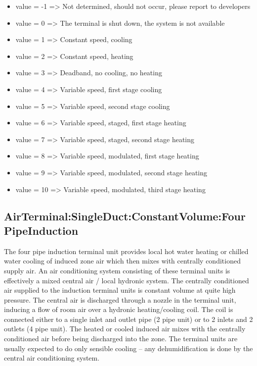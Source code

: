 \begin{itemize}
\item
  value = -1  => Not determined, should not occur, please report to developers
\item
  value = 0 => The terminal is shut down, the system is not available
\item
  value = 1 => Constant speed, cooling
\item
  value = 2 => Constant speed, heating
\item
  value = 3 => Deadband, no cooling, no heating
\item
  value = 4 => Variable speed, first stage cooling
\item
  value = 5 => Variable speed, second stage cooling
\item
  value = 6 => Variable speed, staged, first stage heating
\item
  value = 7 => Variable speed, staged, second stage heating
\item
  value = 8 => Variable speed, modulated, first stage heating
\item
  value = 9 => Variable speed, modulated, second stage heating
\item
  value = 10 => Variable speed, modulated, third stage heating
\end{itemize}

\subsection{AirTerminal:SingleDuct:ConstantVolume:FourPipeInduction}\label{airterminalsingleductconstantvolumefourpipeinduction}

The four pipe induction terminal unit provides local hot water heating or chilled water cooling of induced zone air which then mixes with centrally conditioned supply air. An air conditioning system consisting of these terminal units is effectively a mixed central air / local hydronic system. The centrally conditioned air supplied to the induction terminal units is constant volume at quite high pressure. The central air is discharged through a nozzle in the terminal unit, inducing a flow of room air over a hydronic heating/cooling coil. The coil is connected either to a single inlet and outlet pipe (2 pipe unit) or to 2 inlets and 2 outlets (4 pipe unit). The heated or cooled induced air mixes with the centrally conditioned air before being discharged into the zone. The terminal units are usually expected to do only sensible cooling -- any dehumidification is done by the central air conditioning system.

